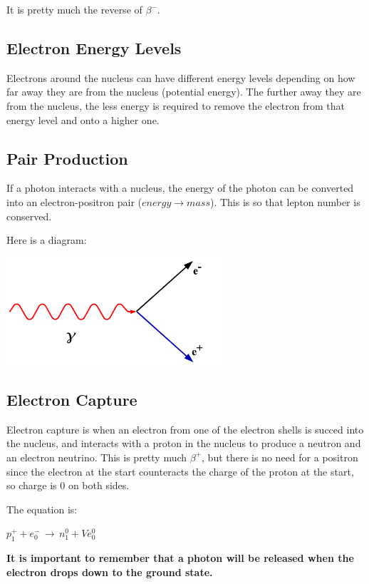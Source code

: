 \documentclass[a4paper, 12pt]{article}
\begin{document}
It is pretty much the reverse of $\beta^-$.

\subsection{Electron Energy Levels}

Electrons around the nucleus can have different energy levels depending on how far away they are from the nucleus (potential energy). The further away they are from the nucleus, the less energy is required to remove the electron from that energy level and onto a higher one.

\subsection{Pair Production}

If a photon interacts with a nucleus, the energy of the photon can be converted into an electron-positron pair ($energy \rightarrow mass$). This is so that lepton number is conserved.

Here is a diagram:

\begin{center}
\includegraphics[height=4cm]{images/pairProduction.png}
\end{center}

\subsection{Electron Capture}

Electron capture is when an electron from one of the electron shells is succed into the nucleus, and interacts with a proton in the nucleus to produce a neutron and an electron neutrino. This is pretty much $\beta^+$, but there is no need for a positron since the electron at the start counteracts the charge of the proton at the start, so charge is 0 on both sides.

The equation is:

$p^+_1 + e^-_0 \, \rightarrow \, n^0_1 + Ve^0_0$

\textbf{It is important to remember that a photon will be released when the electron drops down to the ground state.}
\end{document}
